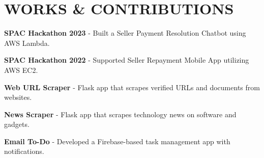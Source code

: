 \section{WORKS \& CONTRIBUTIONS}
\begin{onecolentry}
    \begin{highlights}
        \item \textbf{SPAC Hackathon 2023} - Built a Seller Payment Resolution Chatbot using AWS Lambda.
        \item \textbf{SPAC Hackathon 2022} - Supported Seller Repayment Mobile App utilizing AWS EC2.
        \item \textbf{Web URL Scraper} - Flask app that scrapes verified URLs and documents from websites. {}
        \item \textbf{News Scraper} - Flask app that scrapes technology news on software and gadgets. {}
        \item \textbf{Email To-Do} - Developed a Firebase-based task management app with notifications.
        {}
    \end{highlights}
\end{onecolentry}